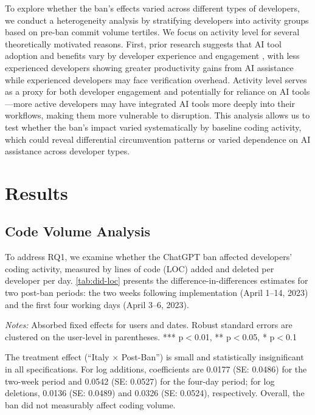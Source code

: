To explore whether the ban's effects varied across different types of developers, we conduct a heterogeneity analysis by stratifying developers into activity groups based on pre-ban commit volume tertiles. We focus on activity level for several theoretically motivated reasons. First, prior research suggests that AI tool adoption and benefits vary by developer experience and engagement \cite[p.~19]{cui2025the}, with less experienced developers showing greater productivity gains from AI assistance while experienced developers may face verification overhead. Activity level serves as a proxy for both developer engagement and potentially for reliance on AI tools---more active developers may have integrated AI tools more deeply into their workflows, making them more vulnerable to disruption. This analysis allows us to test whether the ban's impact varied systematically by baseline coding activity, which could reveal differential circumvention patterns or varied dependence on AI assistance across developer types.

\section{Results}

\subsection{Code Volume Analysis}

To address RQ1, we examine whether the ChatGPT ban affected developers’ coding activity, measured by lines of code (LOC) added and deleted per developer per day. \autoref{tab:did-loc} presents the difference-in-differences estimates for two post-ban periods: the two weeks following implementation (April 1--14, 2023) and the first four working days (April 3--6, 2023).

\begin{table}[htbp]
  \centering
  \caption{Difference-in-Differences Results: LOC Added / Deleted}
  \label{tab:did-loc}
  
  \par\vspace{0.1cm}
  \textit{Notes:} Absorbed fixed effects for users and dates. Robust standard errors are clustered on the user-level in parentheses. *** p$<$0.01, ** p$<$0.05, * p$<$0.1
\end{table}

The treatment effect (``Italy × Post-Ban'') is small and statistically insignificant in all specifications. For log additions, coefficients are 0.0177 (SE: 0.0486) for the two-week period and 0.0542 (SE: 0.0527) for the four-day period; for log deletions, 0.0136 (SE: 0.0489) and 0.0326 (SE: 0.0524), respectively. Overall, the ban did not measurably affect coding volume.

